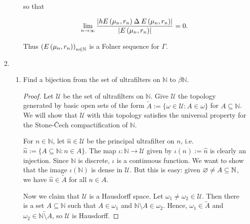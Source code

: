 \documentclass[a4paper,10pt]{report}
\newcommand{\N}{\mathbb{N}}
\begin{document}
\begin{enumerate}
\begin{enumerate}
                  so that

                  \begin{align*}
                    \lim_{n \to \infty} \frac{\left| h E \left( \mu_n , r_n \right) \mathbin{\Delta} E \left( \mu_n , r_n \right) \right|}{\left| E \left( \mu_n , r_n \right) \right|} = 0.
                  \end{align*}

                  Thus $\left( E \left( \mu_n ,r_n \right) \right)_{n \in \mathbb N}$ is a Folner sequence for $\Gamma$.

                  
		\end{enumerate}
	\item
		\begin{enumerate}
			\item Find a bijection from the set of ultrafilters on $\N$ to $\beta\N$.
				\begin{proof}
					Let $\mathscr{U}$ be the set of ultrafilters on $\N$.
					Give $\mathscr{U}$ the topology generated by basic open sets of the form
					$\widetilde{A} := \{\omega \in \mathscr{U} : A \in \omega\}$ for $A \subseteq \N$.
					We will show that $\mathscr{U}$ with this topology satisfies the universal
					property for the Stone-\v{C}ech compactification of $\N$.
					
					For $n \in \N$, let $\widehat{n} \in \mathscr{U}$ be the principal ultrafilter
					on $n$, i.e. $\widehat{n} := \{A \subseteq \N : n \in A\}$.
					The map $\iota : \N \to \mathscr{U}$ given by $\iota(n) := \widehat{n}$
					is clearly an injection.
					Since $\N$ is discrete, $\iota$ is a continuous function.
					We want to show that the image $\iota(\N)$ is dense in $\mathscr{U}$.
					But this is easy: given $\es \ne A \subseteq \N$,
					we have $\widehat{n} \in \widetilde{A}$ for all $n \in A$.
					
					Now we claim that $\mathscr{U}$ is a Hausdorff space.
					Let $\omega_1 \ne \omega_2 \in \mathscr{U}$.
					Then there is a set $A \subseteq \N$ such that $A \in \omega_1$
					and $\N \setminus A \in \omega_2$.
					Hence, $\omega_1 \in \widetilde{A}$
					and $\omega_2 \in \widetilde{\N \setminus A}$, so $\mathscr{U}$ is Hausdorff.
					

\end{proof}
\end{enumerate}
\end{enumerate}
\end{document}
